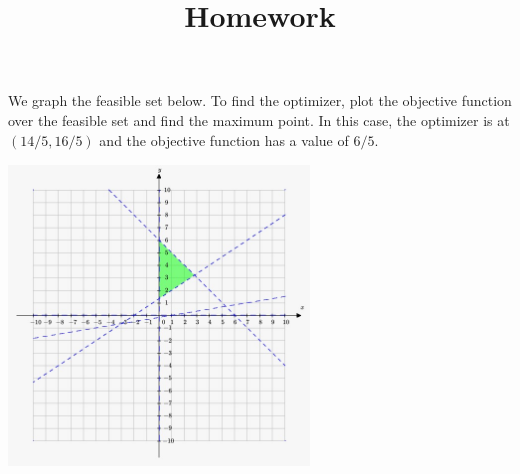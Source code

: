 \documentclass[12pt]{article}
\title{Homework}
\newenvironment{problem}[2][Problem]{\begin{trivlist}
\item[\hskip \labelsep {\bfseries #1}\hskip \labelsep {\bfseries #2}]}{\end{trivlist}}
\begin{document}
\begin{problem}{8.1.} We graph the feasible set below. To find the optimizer, plot the objective function over the feasible set and find the maximum point. In this case, the optimizer is at $(14/5, 16/5)$ and the objective function has a value of $6/5$. 
\begin{center}
\includegraphics[width=8cm, height=8cm]{prob1.jpeg}
\end{center}
\end{problem}
\end{document}
